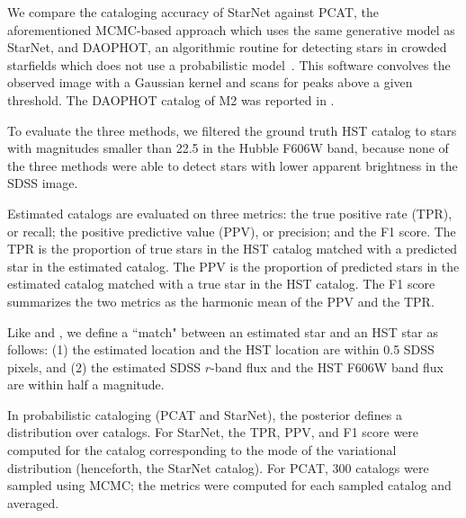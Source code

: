We compare the cataloging accuracy of StarNet
against PCAT, the aforementioned MCMC-based approach which uses the same generative model as StarNet, 
and DAOPHOT, an algorithmic routine for detecting stars in crowded starfields
which does not use a probabilistic model~\citep{stetson2987daophot}.
This software convolves the observed image with a Gaussian kernel and scans for peaks above a given threshold.
The DAOPHOT catalog of M2 was reported in \cite{An_2008_m2}.



To evaluate the three methods, we filtered the ground truth HST catalog to stars with magnitudes smaller than 22.5 in the Hubble F606W band,
because none of the three methods were able to detect stars
with lower apparent brightness in the SDSS image.


Estimated catalogs are evaluated on three metrics: the true positive rate (TPR), or recall;
the positive predictive value (PPV), or precision;
and the F1 score.
The TPR is the proportion of true stars in the HST catalog matched with a predicted star in the estimated catalog.
The PPV is the proportion of predicted stars in the estimated catalog matched with a true star in the HST catalog.
The F1 score summarizes the two metrics as the harmonic mean of the PPV and the TPR.

Like \cite{Portillo_2017} and \cite{Feder_2019}, we define a ``match" between an estimated star
and an HST star as follows: (1) the estimated location and the HST location are within 0.5 SDSS pixels,
and (2) the estimated SDSS $r$-band flux and the HST F606W band flux are within half a magnitude.

In probabilistic cataloging (PCAT and StarNet), the posterior defines a distribution over catalogs.
For StarNet, the TPR, PPV, and F1 score were computed for the catalog corresponding to the mode of the variational distribution (henceforth, the StarNet catalog).
For PCAT, 300 catalogs were sampled using MCMC; the metrics were computed for each sampled catalog and averaged.


